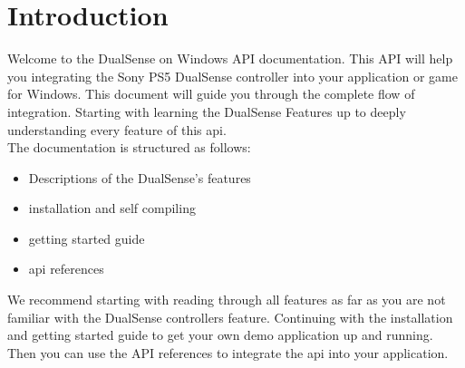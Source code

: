 \section{Introduction}
Welcome to the DualSense on Windows API documentation. This API will help you integrating the Sony PS5 DualSense controller into your application or game for Windows. This document will guide you through the complete flow of integration. Starting with learning the DualSense Features up to deeply understanding every feature of this api.\\
The documentation is structured as follows:
\begin{itemize}
	\item Descriptions of the DualSense's features
	\item installation and self compiling
	\item getting started guide
	\item api references
\end{itemize}

We recommend starting with reading through all features as far as you are not familiar with the DualSense controllers feature. Continuing with the installation and getting started guide to get your own demo application up and running. Then you can use the API references to integrate the api into your application.

\newpage